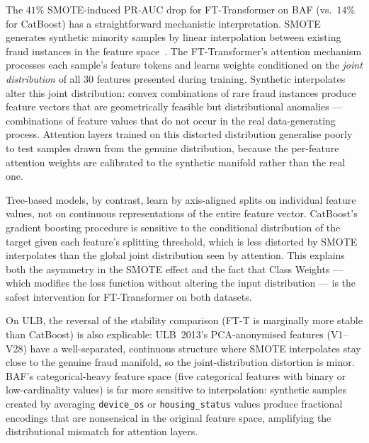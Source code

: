 \documentclass[a4paper,fleqn]{cas-sc}
\begin{document}
The $41\%$ SMOTE-induced PR-AUC drop for FT-Transformer on BAF
(vs.\ $14\%$ for CatBoost) has a straightforward mechanistic interpretation.
SMOTE generates synthetic minority samples by linear interpolation between
existing fraud instances in the feature space~\citep{chawla2002smote}.
The FT-Transformer's attention mechanism processes each sample's feature
tokens and learns weights conditioned on the \emph{joint distribution} of
all $30$ features presented during training.
Synthetic interpolates alter this joint distribution: convex combinations
of rare fraud instances produce feature vectors that are geometrically feasible
but distributional anomalies --- combinations of feature values that do not
occur in the real data-generating process.
Attention layers trained on this distorted distribution generalise poorly
to test samples drawn from the genuine distribution, because the
per-feature attention weights are calibrated to the synthetic manifold rather
than the real one.

Tree-based models, by contrast, learn by axis-aligned splits on individual
feature values, not on continuous representations of the entire feature vector.
CatBoost's gradient boosting procedure is sensitive to the conditional distribution
of the target given each feature's splitting threshold, which is less distorted
by SMOTE interpolates than the global joint distribution seen by attention.
This explains both the asymmetry in the SMOTE effect and the fact that
Class Weights --- which modifies the loss function without altering the input
distribution --- is the safest intervention for FT-Transformer on both datasets.

On ULB, the reversal of the stability comparison (FT-T is marginally more stable
than CatBoost) is also explicable: ULB~2013's PCA-anonymised features
(V1--V28) have a well-separated, continuous structure where SMOTE interpolates
stay close to the genuine fraud manifold, so the joint-distribution distortion
is minor.
BAF's categorical-heavy feature space (five categorical features with binary
or low-cardinality values) is far more sensitive to interpolation: synthetic
samples created by averaging \texttt{device\_os} or \texttt{housing\_status}
values produce fractional encodings that are nonsensical in the original
feature space, amplifying the distributional mismatch for attention layers.
\end{document}
